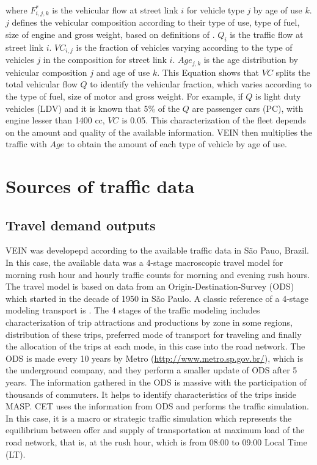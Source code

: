 \documentclass[12pt,graybox,envcountchap,sectrefs]{krantz}
\theoremstyle{definition}
\theoremstyle{definition}
\theoremstyle{definition}
\theoremstyle{remark}
\begin{document}
where \(F^*_{i,j,k}\) is the vehicular flow at street link \(i\) for
vehicle type \(j\) by age of use \(k\). \(j\) defines the vehicular
composition according to their type of use, type of fuel, size of engine
and gross weight, based on definitions of \citep{Corvalanetal2002}.
\(Q_i\) is the traffic flow at street link \(i\). \(VC_{i,j}\) is the
fraction of vehicles varying according to the type of vehicles \(j\) in
the composition for street link \(i\). \(Age_{j,k}\) is the age
distribution by vehicular composition \(j\) and age of use \(k\). This
Equation shows that \(VC\) splits the total vehicular flow \(Q\) to
identify the vehicular fraction, which varies according to the type of
fuel, size of motor and gross weight. For example, if \(Q\) is light
duty vehicles (LDV) and it is known that 5\% of the \(Q\) are passenger
cars (PC), with engine lesser than 1400 cc, \(VC\) is 0.05. This
characterization of the fleet depends on the amount and quality of the
available information. VEIN then multiplies the traffic with \(Age\) to
obtain the amount of each type of vehicle by age of use.

\section{Sources of traffic data}\label{sources-of-traffic-data}

\subsection{Travel demand outputs}\label{travel-demand-outputs}

VEIN was developepd according to the available traffic data in São Pauo,
Brazil. In this case, the available data was a 4-stage macroscopic
travel model for morning rush hour and hourly traffic counts for morning
and evening rush hours. The travel model is based on data from an
Origin-Destination-Survey (ODS) \citep{ODS} which started in the decade
of 1950 in São Paulo. A classic reference of a 4-stage modeling
transport is \citep{OrtuzarWillumsen2002}. The 4 stages of the traffic
modeling includes characterization of trip attractions and productions
by zone in some regions, distribution of these trips, preferred mode of
transport for traveling and finally the allocation of the trips at each
mode, in this case into the road network. The ODS is made every 10 years
by Metro (\url{http://www.metro.sp.gov.br/}), which is the underground
company, and they perform a smaller update of ODS after 5 years. The
information gathered in the ODS is massive with the participation of
thousands of commuters. It helps to identify characteristics of the
trips inside MASP. CET uses the information from ODS and performs the
traffic simulation. In this case, it is a macro or strategic traffic
simulation which represents the equilibrium between offer and supply of
transportation at maximum load of the road network, that is, at the rush
hour, which is from 08:00 to 09:00 Local Time (LT).
\end{document}
